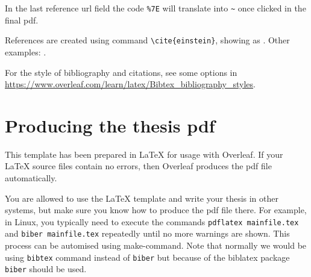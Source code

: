 In the last reference url field the code \verb+%7E+ will translate into \verb+~+ once clicked in the final pdf.

References are created using command \texttt{\textbackslash cite\{einstein\}}, showing as \citep{einstein}. Other examples: \citep{latexcompanion,knuthwebsite}.

For the style of bibliography and citations, see some options in \url{https://www.overleaf.com/learn/latex/Bibtex_bibliography_styles}.


\section{Producing the thesis pdf}

This template has been prepared in LaTeX for usage with Overleaf. If your LaTeX source files contain no errors, then Overleaf produces the pdf file automatically.

You are allowed to use the LaTeX template and write your thesis in other systems, but make sure you know how to produce the pdf file there. 
For example, in Linux, you typically need to execute the commands \texttt{pdflatex mainfile.tex} and \texttt{biber mainfile.tex} repeatedly until no more warnings are shown. This process can be automised using make-command. 
Note that normally we would be using \texttt{bibtex} command instead of \texttt{biber} but because of the biblatex package \texttt{biber} should be used.
